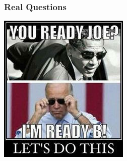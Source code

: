 \documentclass{beamer}
\begin{document}
\begin{frame}
\frametitle{Real Questions}
    \centering
	   \includegraphics[scale = 0.75]{letsDoThis2.jpg}
\end{frame} 
\end{document}
